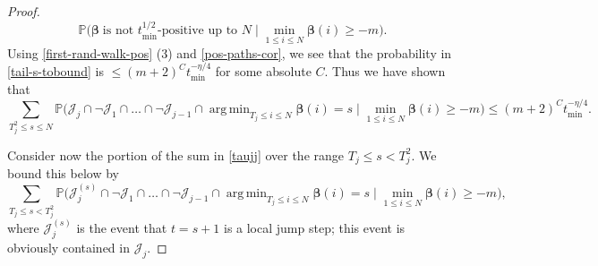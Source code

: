 \documentclass[11pt,reqno]{amsart}
\DeclareMathOperator*{\argmin}{arg\,min}
\numberwithin{equation}{section}
\theoremstyle{definition}
\theoremstyle{remark}
\newcommand{\mb}{\mathbb}
\def\boldbeta{\boldsymbol\beta}
\renewcommand{\le}{\leqslant}
\renewcommand{\ge}{\geqslant}
\begin{document}
\begin{proof}
\[ \mb{P} \big(   \boldbeta \; \mbox{is not $t_{\min}^{1/2}$-positive up to $N$} \mid \min_{1 \le i \le N} \boldbeta(i) \ge -m\big).\]
Using \cref{first-rand-walk-pos} (3) and \cref{pos-paths-cor}, we see that the probability in \cref{tail-s-tobound} is $\le (m + 2)^{C} t_{\min}^{-\eta/4}$ for some absolute $C$. Thus we have shown that 
\begin{equation}\label{large-s-sum-jump} \sum_{T_j^2 \le s \le N} \mb{P} \big( \mathcal{J}_j \cap \neg \mathcal{J}_1 \cap \dots \cap \neg\mathcal{J}_{j-1} \cap \argmin_{T_j \le i \le N} \boldbeta(i) = s \mid \min_{1 \le i \le N} \boldbeta(i) \ge -m\big) \le (m + 2)^{C} t_{\min}^{-\eta/4}.\end{equation}

Consider now the portion of the sum in \cref{taujj} over the range $T_j \le s < T_{j}^2$.
We bound this below by
\begin{equation}\label{small-s-sum-jump} \sum_{T_j \le s < T_j^2} \mb{P} \big( \mathcal{J}^{(s)}_j \cap \neg \mathcal{J}_1 \cap \dots \cap \neg\mathcal{J}_{j-1} \cap \argmin_{T_j \le i \le N} \boldbeta(i) = s \mid \min_{1 \le i \le N} \boldbeta(i) \ge -m\big) ,\end{equation} where $\mathcal{J}^{(s)}_j$ is the event that $t = s+1$ is a local jump step; this event is obviously contained in $\mathcal{J}_j$.


\end{proof}
\end{document}
